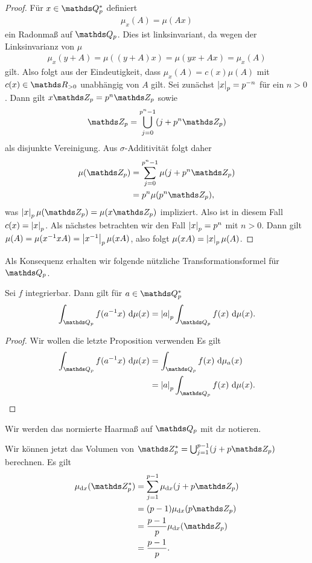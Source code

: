\begin{proof}
Für $x \in \Q_p^\ast$ definiert
\begin{align*}
\mu_x(A)=\mu(Ax)
\end{align*}
ein Radonmaß auf $\Q_p$.
Dies ist linksinvariant, da wegen der Linksinvarianz von $\mu$
\begin{align*}
\mu_x(y+A)=\mu((y+A)x)=\mu(yx+Ax)=\mu_x(A)
\end{align*}
gilt.
Also folgt aus der Eindeutigkeit, dass $\mu_x(A)=c(x)\mu(A)$ mit $c(x)\in \R_{> 0}$ unabhängig von $A$ gilt.
Sei zunächst $\left\vert x\right\vert_p=p^{-n}$ für ein $n>0$.
Dann gilt $x\Z_p=p^n\Z_p$ sowie 
\begin{align*}
\Z_p=\bigcup_{j=0}^{p^n-1}(j+p^n\Z_p)
\end{align*}
als disjunkte Vereinigung.
Aus $\sigma$-Additivität folgt daher
\begin{align*}
\mu(\Z_p)&=\sum_{j=0}^{p^n-1} \mu(j+p^n\Z_p)\\
&=p^n \mu(p^n \Z_p),
\end{align*}
was $\abs{x}_p\mu(\Z_p)=\mu(x\Z_p)$ impliziert.
Also ist in diesem Fall $c(x)=\left\vert x\right\vert_p$.
Als nächstes betrachten wir den Fall $\left\vert x\right\vert_p=p^n$ mit $n>0$.
Dann gilt
$\mu(A)=\mu(x^{-1}xA)=\left\vert x^{-1}\right\vert_p\mu(xA)$,
also folgt $\mu(xA)=\left\vert x\right\vert_p\mu(A)$.
\end{proof}

Als Konsequenz erhalten wir folgende nützliche Transformationsformel für $\Q_p$.

\begin{cor}
Sei $f$ integrierbar. Dann gilt für $a \in \Q_p^\ast$
\begin{align*}
\int_{\Q_p}f(a^{-1}x)~\mathrm{d}\mu(x)=\abs{a}_p\int_{\Q_p}f(x)~\mathrm{d}\mu(x).
\end{align*}
\end{cor}
\begin{proof}
Wir wollen die letzte Proposition verwenden
Es gilt 
\begin{align*}
\int_{\Q_p}f(a^{-1}x)~\mathrm{d}\mu(x)&=\int_{\Q_p} f(x)~\mathrm{d}\mu_a(x)\\
&=\abs{a}_p \int_{\Q_p} f(x)~\mathrm{d}\mu(x). \qedhere
\end{align*}
\end{proof}
Wir werden das normierte Haarmaß auf $\Q_p$ mit $\mathrm{d}x$ notieren.


\begin{bsp}
Wir können jetzt das Volumen von $\Z_p^\ast=\bigcup_{j=1}^{p-1}(j+p\Z_p)$ berechnen.
Es gilt
\begin{align*}
\mu_{\mathrm{d}x}(\Z_p^\ast)&=\sum_{j=1}^{p-1} \mu_{\mathrm{d}x}(j+p\Z_p)\\
&=(p-1)\mu_{\mathrm{d}x}(p \Z_p)\\
&=\frac{p-1}{p}\mu_{\mathrm{d}x}(\Z_p)\\
&=\frac{p-1}{p}.
\end{align*}
\end{bsp}

